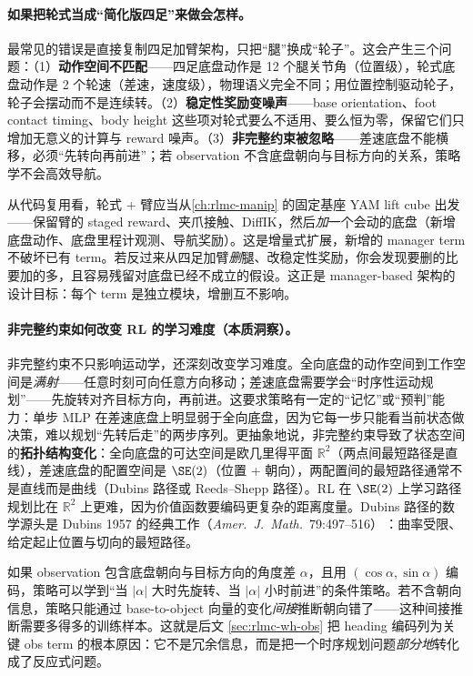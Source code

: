\paragraph{如果把轮式当成“简化版四足”来做会怎样。}最常见的错误是直接复制四足加臂架构，只把“腿”换成“轮子”。这会产生三个问题：（1）\textbf{动作空间不匹配}——四足底盘动作是 12 个腿关节角（位置级），轮式底盘动作是 2 个轮速（差速，速度级），物理语义完全不同；用位置控制驱动轮子，轮子会摆动而不是连续转。（2）\textbf{稳定性奖励变噪声}——base orientation、foot contact timing、body height 这些项对轮式要么不适用、要么恒为零，保留它们只增加无意义的计算与 reward 噪声。（3）\textbf{非完整约束被忽略}——差速底盘不能横移，必须“先转向再前进”；若 observation 不含底盘朝向与目标方向的关系，策略学不会高效导航。

\begin{insight}\label{ins:rlmc-wh-entry}
从代码复用看，轮式 + 臂应当从\cref{ch:rlmc-manip} 的固定基座 YAM lift cube 出发——保留臂的 staged reward、夹爪接触、DiffIK，然后\emph{加}一个会动的底盘（新增底盘动作、底盘里程计观测、导航奖励）。这是增量式扩展，新增的 manager term 不破坏已有 term。若反过来从四足加臂\emph{删}腿、改稳定性奖励，你会发现要删的比要加的多，且容易残留对底盘已经不成立的假设。这正是 manager-based 架构的设计目标：每个 term 是独立模块，增删互不影响。
\end{insight}

\paragraph{非完整约束如何改变 RL 的学习难度（本质洞察）。}非完整约束不只影响运动学，还深刻改变学习难度。全向底盘的动作空间到工作空间是\emph{满射}——任意时刻可向任意方向移动；差速底盘需要学会“时序性运动规划”——先旋转对齐目标方向，再前进。这要求策略有一定的“记忆”或“预判”能力：单步 MLP 在差速底盘上明显弱于全向底盘，因为它每一步只能看当前状态做决策，难以规划“先转后走”的两步序列。更抽象地说，非完整约束导致了状态空间的\textbf{拓扑结构变化}：全向底盘的可达空间是欧几里得平面 $\mathbb{R}^2$（两点间最短路径是直线），差速底盘的配置空间是 $\SE(2)$（位置 + 朝向），两配置间的最短路径通常不是直线而是曲线（Dubins 路径或 Reeds--Shepp 路径）。RL 在 $\SE(2)$ 上学习路径规划比在 $\mathbb{R}^2$ 上更难，因为价值函数要编码更复杂的距离度量。Dubins 路径的数学源头是 Dubins 1957 的经典工作（\textit{Amer.\ J.\ Math.}\ 79:497--516）\,\cite{dubins1957curves}：曲率受限、给定起止位置与切向的最短路径。

\begin{insight}\label{ins:rlmc-wh-heading}
如果 observation 包含底盘朝向与目标方向的角度差 $\alpha$，且用 $(\cos\alpha,\sin\alpha)$ 编码，策略可以学到“当 $|\alpha|$ 大时先旋转、当 $|\alpha|$ 小时前进”的条件策略。若不含朝向信息，策略只能通过 base-to-object 向量的变化\emph{间接}推断朝向错了——这种间接推断需要多得多的训练样本。这就是后文 \cref{sec:rlmc-wh-obs} 把 heading 编码列为关键 obs term 的根本原因：它不是冗余信息，而是把一个时序规划问题\emph{部分地}转化成了反应式问题。
\end{insight}

